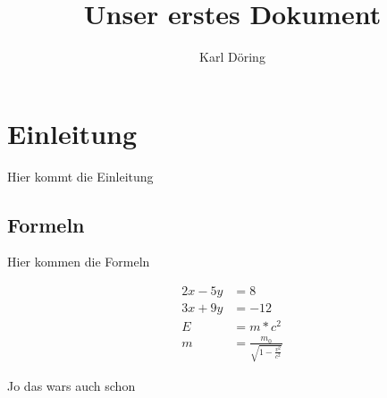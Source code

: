 \documentclass[a4paper, 10pt]{scrartcl}
\title{Unser erstes Dokument}
\author{Karl Döring}
\begin{document}
 

\maketitle

\tableofcontents

 

\section{Einleitung}

Hier kommt die Einleitung

 

\subsection{Formeln}

Hier kommen die Formeln


\begin{align*} 
    2x - 5y &=  8 \\ 
    3x + 9y &=  -12 \\
    E &= m*c^2 \\
    m &= \frac{m_0}{\sqrt{1-\frac{v^2}{c^2}}}
\end{align*}


Jo das wars auch schon 

 
\end{document}
